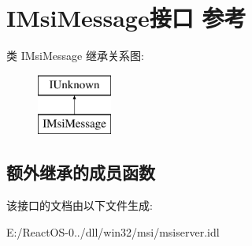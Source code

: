 \hypertarget{interface_i_msi_message}{}\section{I\+Msi\+Message接口 参考}
\label{interface_i_msi_message}
类 I\+Msi\+Message 继承关系图\+:\begin{figure}[H]
\begin{center}
\leavevmode
\includegraphics[height=2.000000cm]{interface_i_msi_message}
\end{center}
\end{figure}
\subsection*{额外继承的成员函数}


该接口的文档由以下文件生成\+:\begin{DoxyCompactItemize}
\item 
E\+:/\+React\+O\+S-\/0../dll/win32/msi/msiserver.\+idl\end{DoxyCompactItemize}
